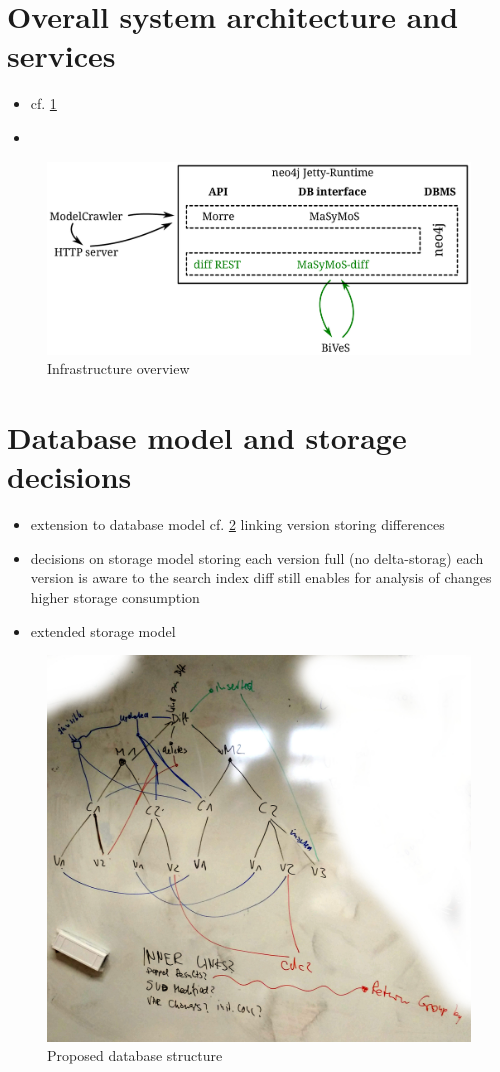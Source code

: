 \section{Overall system architecture and services}
\begin{itemize}
	\item cf. \ref{fig:system-overview}
	\item {}
\end{itemize}

\begin{figure}[h]
	\center
	\includegraphics[width=\textwidth]{resources/system-overview-matrix.pdf}
	\caption{Infrastructure overview}
	\label{fig:system-overview}
\end{figure}

\section{Database model and storage decisions}
\begin{itemize}
\item extension to database model cf. \ref{fig:db-model}
	\subitem linking version
	\subitem storing differences
\item decisions on storage model
	\subitem storing each version full (no delta-storag)
	\subitem each version is aware to the search index
	\subitem diff still enables for analysis of changes
	\subitem higher storage consumption
\item extended storage model
\end{itemize}

\begin{figure}[h]
	\includegraphics[width=\textwidth]{resources/db_structure.jpg}
	\caption{Proposed database structure}
	\label{fig:db-model}
\end{figure}

